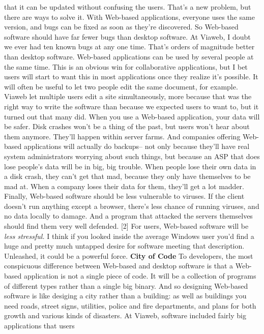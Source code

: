 that it can be updated without confusing the users.  That's a new
problem, but there are ways to solve it.
With Web-based applications, everyone uses the same version, and
bugs can be fixed as soon as they're discovered.  So Web-based
software should have far fewer bugs than desktop software.  At
Viaweb, I doubt we ever had ten known bugs at any one time.  That's
orders of magnitude better than desktop software.
Web-based applications can be used by several people at the same
time.  This is an obvious win for collaborative applications, but
I bet users will start to want this in most applications once they
realize it's possible.  It will often be useful to let two people
edit the same document, for example.  Viaweb let multiple users
edit a site simultaneously, more because that was the right way to
write the software than because we expected users to want to, but
it turned out that many did.
When you use a Web-based application, your data will be safer.
Disk crashes won't be a thing of the past, but users won't hear
about them anymore.  They'll happen within server farms.  And
companies offering Web-based applications will actually do backups--
not only because they'll have real system administrators worrying
about such things, but because an ASP that does lose people's data
will be in big, big trouble.  When people lose their own data in
a disk crash, they can't get that mad, because they only have
themselves to be mad at.  When a company loses their data for them,
they'll get a lot madder.
Finally, Web-based software should be less vulnerable to viruses.
If the client doesn't run anything except a browser, there's less
chance of running viruses, and no data locally to damage.  And a
program that attacked the servers themselves should find them very
well defended. [2]
For users, Web-based software will be \emph{less stressful.}  I think if
you looked inside the average Windows user you'd find a huge and
pretty much untapped desire for software meeting that description.
Unleashed, it could be a powerful force.
\textbf{City of Code}
To developers, the most conspicuous difference between Web-based
and desktop software is that a Web-based application is not a single
piece of code.  It will be a collection of programs of different
types rather than a single big binary.  And so designing Web-based
software is like desiging a city rather than a building: as well
as buildings you need roads, street signs, utilities, police and
fire departments, and plans for both growth and various kinds of
disasters.
At Viaweb, software included fairly big applications that users
